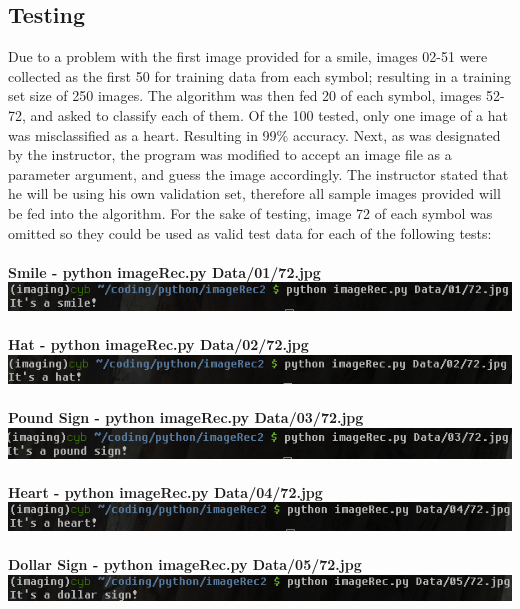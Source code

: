 \documentclass[]{report}
\begin{document}
\subsection{Testing}
{\fontsize{14}{4}\selectfont Due to a problem with the first image provided for a smile, images 02-51 were collected as the first 50 for training data from each symbol; resulting in a training set size of 250 images. The algorithm was then fed 20 of each symbol, images 52-72, and asked to classify each of them. Of the 100 tested, only one image of a hat was misclassified as a heart. Resulting in 99\% accuracy. 
Next, as was designated by the instructor, the program was modified to accept an image file as a parameter argument, and guess the image accordingly. The instructor stated that he will be using his own validation set, therefore all sample images provided will be fed into the algorithm. For the sake of testing, image 72 of each symbol was omitted so they could be used as valid test data for each of the following tests:\\\\
\textbf{Smile - python imageRec.py Data/01/72.jpg}\\
\includegraphics{test1}\\\\
\textbf{Hat - python imageRec.py Data/02/72.jpg}\\
\includegraphics{test2}\\\\
\textbf{Pound Sign - python imageRec.py Data/03/72.jpg}\\
\includegraphics{test3}\\\\
\textbf{Heart - python imageRec.py Data/04/72.jpg}\\
\includegraphics{test4}\\\\
\textbf{Dollar Sign - python imageRec.py Data/05/72.jpg}\\
\includegraphics{test5}\\
}
\end{document}

